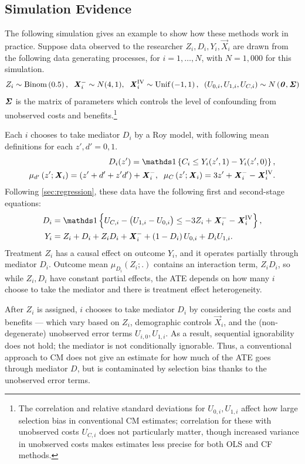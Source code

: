 \subsection{Simulation Evidence}
\label{sec:simulations}
The following simulation gives an example to show how these methods work in practice.
Suppose data observed to the researcher $Z_i, D_i, Y_i, \vec X_i$ are drawn from the following data generating processes, for $i = 1, \hdots, N$, with 
$N = 1,000$ for this simulation.
\[ Z_i \sim \text{Binom}\left(0.5 \right),
    \;\; \boldsymbol{\mathit{X}}_i^- \sim N(4, 1),
    \;\; \boldsymbol{\mathit{X}}_i^{\text{IV}} \sim \text{Unif}\left( -1, 1 \right),
    \;\; \left( U_{0,i}, U_{1,i}, U_{C,i} \right) \sim
    N\left( \boldsymbol{\mathit{0}}, \boldsymbol{\mathit{\Sigma}} \right) \]
$\boldsymbol{\mathit{\Sigma}}$ is the matrix of parameters which controls the level of confounding from unobserved costs and benefits.\footnote{
    The correlation and relative standard deviations for $U_{0,i}, U_{1,i}$ affect how large selection bias in conventional CM estimates; correlation for these with unobserved costs $U_{C,i}$ does not particularly matter, though increased variance in unobserved costs makes estimates less precise for both OLS and CF methods.
}

Each $i$ chooses to take mediator $D_i$ by a Roy model, with following mean definitions for each $z', d' = 0, 1$.
\begin{align*}
    D_i(z') = \indicator{C_i \leq Y_i(z', 1) - Y_i(z', 0)},  \\
    \mu_{d'}\left(z' ; \vec X_i \right) = \left( z' + d' + z' d' \right) + \vec X_i^-,
    \;\; \mu_{C}\left(z' ; \vec X_i \right) = 3z' + \vec X_i^- - \vec X_i^{\text{IV}}.
\end{align*}
Following \autoref{sec:regression}, these data have the following first and second-stage equations:
\begin{align*}
    D_i &= \indicator{U_{C,i} - \big( U_{1,i} - U_{0,i} \big)
    \leq -3Z_i + \vec X_i^- - \vec X_i^{\text{IV}}},  \\
    Y_i &= Z_i + D_i + Z_i D_i + \vec X_i^-
        + \left( 1 - D_i \right) U_{0,i} + D_i U_{1,i}.
\end{align*}
Treatment $Z_i$ has a causal effect on outcome $Y_i$, and it operates partially through mediator $D_i$.
Outcome mean $\mu_{D_i}(Z_i;.)$ contains an interaction term, $Z_i D_i$, so while $Z_i,D_i$ have constant partial effects, the ATE depends on how many $i$ choose to take the mediator and there is treatment effect heterogeneity.

After $Z_i$ is assigned, $i$ chooses to take mediator $D_i$ by considering the costs and benefits --- which vary based on $Z_i$, demographic controls $\vec X_i$, and the (non-degenerate) unobserved error terms $U_{i,0}, U_{1,i}$.
As a result, sequential ignorability does not hold; the mediator is not conditionally ignorable.
Thus, a conventional approach to CM does not give an estimate for how much of the ATE goes through mediator $D$, but is contaminated by selection bias thanks to the unobserved error terms.

